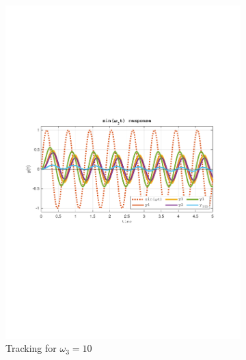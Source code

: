 \documentclass[a4paper, 12pt]{article}
\begin{document}
\begin{figure}[h!]
\begin{subfigure}[t]{0.60\textwidth}
           \includegraphics[width=\textwidth]{Figures/fig07e.pdf}
           \caption{Tracking for $\omega_3 = 10$}
           \label{fig:fig07e}
       \end{subfigure}
    \begin{subfigure}[t]{0.4\textwidth}

\end{subfigure}
\end{figure}
\end{document}
